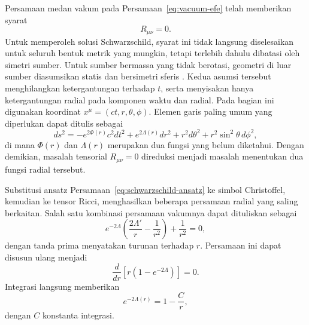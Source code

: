 Persamaan medan vakum pada Persamaan~\eqref{eq:vacuum-efe} telah memberikan
syarat
\begin{equation}
    R_{\mu\nu}=0.
\end{equation}
Untuk memperoleh solusi Schwarzschild, syarat ini tidak langsung diselesaikan
untuk seluruh bentuk metrik yang mungkin, tetapi terlebih dahulu dibatasi oleh
simetri sumber. Untuk sumber bermassa yang tidak berotasi, geometri di luar
sumber diasumsikan statis dan bersimetri sferis
\parencite{Schwarzschild1916Field,Schutz2009FirstCourse,Carroll2004SpacetimeGeometry}.
Kedua asumsi tersebut menghilangkan ketergantungan terhadap $t$, serta
menyisakan hanya ketergantungan radial pada komponen waktu dan radial.
Pada bagian ini digunakan koordinat $x^\mu=(ct,r,\theta,\phi)$. Elemen garis
paling umum yang diperlukan dapat ditulis sebagai
\begin{equation}
    ds^2
    =-e^{2\Phi(r)}c^2dt^2
    +e^{2\Lambda(r)}dr^2
    +r^2d\theta^2
    +r^2\sin^2\!\theta\,d\phi^2,
    \label{eq:schwarzschild-ansatz}
\end{equation}
di mana $\Phi(r)$ dan $\Lambda(r)$ merupakan dua fungsi yang belum diketahui.
Dengan demikian, masalah tensorial $R_{\mu\nu}=0$ direduksi menjadi masalah
menentukan dua fungsi radial tersebut.

Substitusi ansatz Persamaan~\eqref{eq:schwarzschild-ansatz} ke simbol
Christoffel, kemudian ke tensor Ricci, menghasilkan beberapa persamaan
radial yang saling berkaitan. Salah satu kombinasi persamaan vakumnya dapat
dituliskan sebagai
\begin{equation}
    e^{-2\Lambda}
    \left(
        \frac{2\Lambda'}{r}-\frac{1}{r^2}
    \right)
    +\frac{1}{r^2}=0,
    \label{eq:schwarzschild-lambda-ode}
\end{equation}
dengan tanda prima menyatakan turunan terhadap $r$. Persamaan ini dapat
disusun ulang menjadi
\begin{equation}
    \frac{d}{dr}
    \left[r\left(1-e^{-2\Lambda}\right)\right]=0.
    \label{eq:schwarzschild-lambda-total-derivative}
\end{equation}
Integrasi langsung memberikan
\begin{equation}
    e^{-2\Lambda(r)}=1-\frac{C}{r},
    \label{eq:schwarzschild-lambda-solution}
\end{equation}
dengan $C$ konstanta integrasi.

